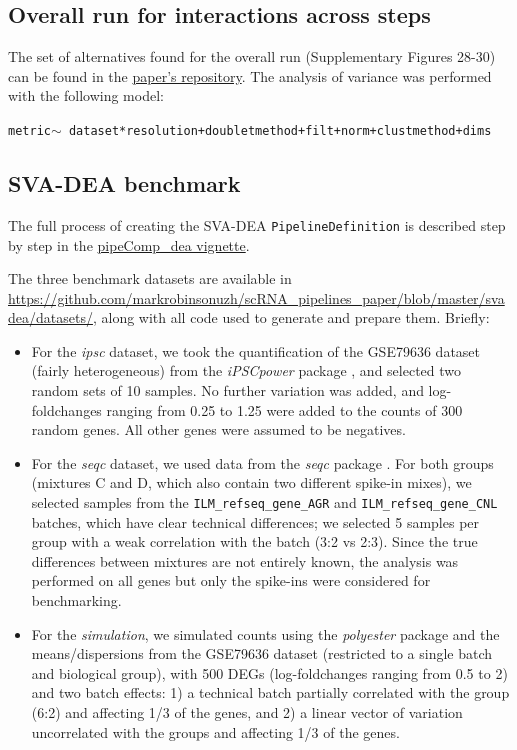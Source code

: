 \documentclass[11pt]{article}
\begin{document}
{\color{red}\subsection*{Overall run for interactions across steps}

The set of alternatives found for the overall run (Supplementary Figures 28-30) can be found in the \href{https://github.com/markrobinsonuzh/scRNA_pipelines_paper/blob/master/data/overall_run.Rmd}{paper's repository}. The analysis of variance was performed with the following model:

\texttt{metric$\sim$ dataset*resolution+doubletmethod+filt+norm+clustmethod+dims}

\subsection*{SVA-DEA benchmark}

The full process of creating the SVA-DEA \texttt{PipelineDefinition} is described step by step in the \href{https://github.com/plger/pipeComp/blob/master/vignettes/pipeComp_dea.Rmd}{pipeComp\_dea vignette}.

The three benchmark datasets are available in \url{https://github.com/markrobinsonuzh/scRNA\_pipelines\_paper/blob/master/svadea/datasets/}, along with all code used to generate and prepare them. Briefly:
\begin{itemize}
    \item For the \textit{ipsc} dataset, we took the quantification of the GSE79636 dataset (fairly heterogeneous) from the \textit{iPSCpower} package \citep{germainTamingHumanGenetic2017}, and selected two random sets of 10 samples. No further variation was added, and log-foldchanges ranging from 0.25 to 1.25 were added to the counts of 300 random genes. All other genes were assumed to be negatives.
    \item For the \textit{seqc} dataset, we used data from the \textit{seqc} package \citep{ComprehensiveAssessment2014}. For both groups (mixtures C and D, which also contain two different spike-in mixes), we selected samples from the \texttt{ILM\_refseq\_gene\_AGR} and \texttt{ILM\_refseq\_gene\_CNL} batches, which have clear technical differences; we selected 5 samples per group with a weak correlation with the batch (3:2 vs 2:3). Since the true differences between mixtures are not entirely known, the analysis was performed on all genes but only the spike-ins were considered for benchmarking.
    \item For the \textit{simulation}, we simulated counts using the \textit{polyester} package \citep{frazeePolyesterSimulating2015} and the means/dispersions from the GSE79636 dataset (restricted to a single batch and biological group), with 500 DEGs (log-foldchanges ranging from 0.5 to 2) and two batch effects: 1) a technical batch partially correlated with the group (6:2) and affecting 1/3 of the genes, and 2) a linear vector of variation uncorrelated with the groups and affecting 1/3 of the genes.
\end{itemize}

}
\end{document}
